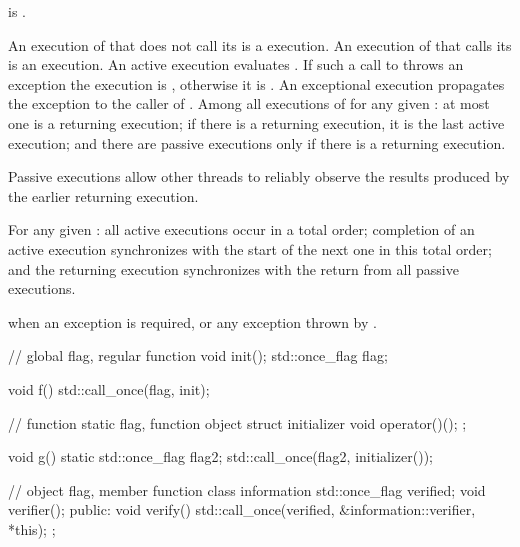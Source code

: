 \begin{itemdescr}
\pnum
\mandates
{} is .

\pnum
\effects
An execution of  that does not call its  is a
 execution. An execution of  that calls its 
is an  execution. An active execution evaluates
. If such a call to 
throws an exception the execution is , otherwise it is .
An exceptional execution propagates the exception to the caller of
. Among all executions of  for any given
: at most one is a returning execution; if there is a
returning execution, it is the last active execution; and there are
passive executions only if there is a returning execution.
\begin{note}
Passive
executions allow other threads to reliably observe the results produced by the
earlier returning execution.
\end{note}

\pnum
\sync
For any given : all active executions occur in a total
order; completion of an active execution synchronizes with
the start of the next one in this total order; and the returning execution
synchronizes with the return from all passive executions.

\pnum
\throws
{} when
an exception is required, or any exception thrown by .

\pnum
\begin{example}
\begin{codeblock}
// global flag, regular function
void init();
std::once_flag flag;

void f() {
  std::call_once(flag, init);
}

// function static flag, function object
struct initializer {
  void operator()();
};

void g() {
  static std::once_flag flag2;
  std::call_once(flag2, initializer());
}

// object flag, member function
class information {
  std::once_flag verified;
  void verifier();
public:
  void verify() { std::call_once(verified, &information::verifier, *this); }
};
\end{codeblock}
\end{example}
\end{itemdescr}


